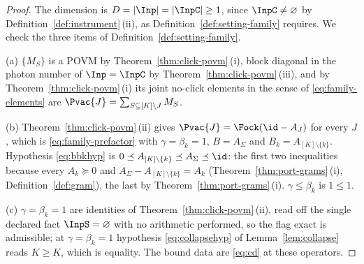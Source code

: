 \begin{proof}
The dimension is $D=|\Inp|=|\InpC|\ge1$, since $\InpC\neq\varnothing$ by
Definition~\ref{def:instrument}\,(ii), as Definition~\ref{def:setting-family}
requires. We check the three items of Definition~\ref{def:setting-family}.

(a) $\{M_S\}$ is a POVM by Theorem~\ref{thm:click-povm}\,(i), block diagonal in
the photon number of $\Inp=\InpC$ by Theorem~\ref{thm:click-povm}\,(iii), and by
Theorem~\ref{thm:click-povm}\,(i) its joint no-click elements in the sense of
\eqref{eq:family-elements} are $\Pvac{J}=\sum_{S\subseteq[K]\setminus J}M_S$.

(b) Theorem~\ref{thm:click-povm}\,(ii) gives $\Pvac{J}=\Fock(\id-A_J)$ for every
$J$, which is \eqref{eq:family-prefactor} with $\gamma=\beta_k=1$,
$B=A_\Sigma$ and $B_k=A_{[K]\setminus\{k\}}$. Hypothesis \eqref{eq:bbkhyp}
is $0\preceq A_{[K]\setminus\{k\}}\preceq A_\Sigma\preceq\id$: the first
two inequalities because every $A_k\succeq0$ and $A_\Sigma-A_{[K]\setminus
\{k\}}=A_k$ (Theorem~\ref{thm:port-grams}\,(i), Definition~\ref{def:gram}), the
last by Theorem~\ref{thm:port-grams}\,(i). $\gamma\le\beta_k$ is $1\le1$.

(c) $\gamma=\beta_k=1$ are identities of Theorem~\ref{thm:click-povm}\,(ii), read
off the single declared fact $\InpS=\varnothing$ with no arithmetic
performed, so the flag $\mathrm{exact}$ is admissible; at
$\gamma=\beta_k=1$ hypothesis \eqref{eq:collapsehyp} of
Lemma~\ref{lem:collapse} reads $K\ge K$, which is equality. The bound data
are \eqref{eq:cd} at these operators.
\end{proof}
